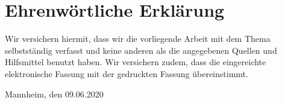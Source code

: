 
\clearpage
\chapter*{Ehrenwörtliche Erklärung}

Wir versichern hiermit, dass wir die vorliegende Arbeit mit dem Thema \textit{\DerTitelDerArbeit} selbstständig verfasst und keine anderen als die angegebenen Quellen und Hilfsmittel benutzt haben.
Wir versichern zudem, dass die eingereichte elektronische Fassung mit der gedruckten Fassung übereinstimmt.

\vspace{2cm}
Mannheim, den 09.06.2020

\vspace{10mm}
\authorSG
\hfill \authorRF
\hfill \authorMS

\vspace{5mm}
\hfill \authorEJ
\hfill \authorNL
\hfill